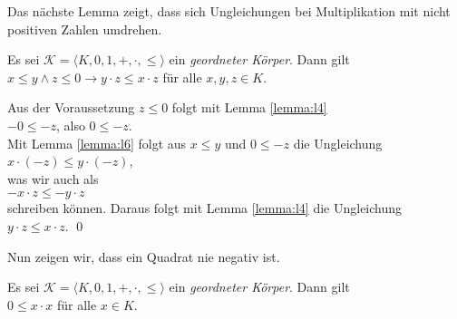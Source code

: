 Das n\"achste Lemma zeigt, dass sich Ungleichungen bei Multiplikation mit nicht positiven Zahlen
umdrehen. 

\begin{Lemma} 
  Es sei  $\mathcal{K} = \langle K, 0, 1, +, \cdot, \leq \rangle$ ein \emph{geordneter K\"orper}.
  Dann gilt
  \\[0.2cm]
  \hspace*{1.3cm} $x \leq y \wedge z \leq 0 \rightarrow y \cdot z \leq x \cdot z$  
  \quad f\"ur alle $x,y,z \in K$.
\end{Lemma}

\proof
Aus der Voraussetzung $z \leq 0$ folgt mit Lemma \ref{lemma:l4}
\\[0.2cm]
\hspace*{1.3cm}
$-0 \leq -z$, \quad also $0 \leq -z$.
\\[0.2cm]
Mit Lemma \ref{lemma:l6} folgt aus $x \leq y$ und $0 \leq -z$ die Ungleichung
\\[0.2cm]
\hspace*{1.3cm}
$x \cdot (-z) \leq y \cdot (-z)$,
\\[0.2cm]
was wir auch als
\\[0.2cm]
\hspace*{1.3cm}
$-x \cdot z \leq -y \cdot z$
\\[0.2cm]
schreiben k\"onnen.  Daraus folgt mit Lemma \ref{lemma:l4} die Ungleichung
\\[0.2cm]
\hspace*{1.3cm}
$y \cdot z \leq x \cdot z$. \qed

Nun zeigen wir, dass ein Quadrat nie negativ ist.

\begin{Lemma} 
  Es sei  $\mathcal{K} = \langle K, 0, 1, +, \cdot, \leq \rangle$ ein \emph{geordneter K\"orper}.
  Dann gilt
  \\[0.2cm]
  \hspace*{1.3cm} $0 \leq x \cdot x$  
  \quad f\"ur alle $x \in K$.
\end{Lemma}

